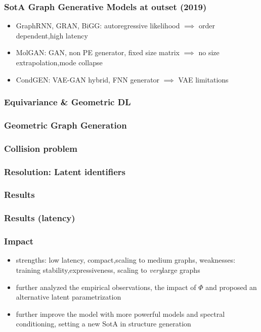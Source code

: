 \documentclass[./presentation.tex]{subfiles}
\begin{document}
\begin{frame}[label=working]
  \frametitle{SotA Graph Generative Models at outset (2019)}
  \begin{itemize}
    \item GraphRNN, GRAN, BiGG: autoregressive likelihood $\implies$ order dependent,high latency
    \item MolGAN: GAN, non PE generator, fixed size matrix  $\implies$ no size extrapolation,mode collapse
    \item CondGEN: VAE-GAN hybrid, FNN generator $\implies$ VAE limitations \citep{bousquetOptimalTransportGenerative2017a, genevayGANVAEOptimal2017e}
  \end{itemize}
\end{frame}

\begin{frame}[label=working]
  \frametitle{Equivariance \& Geometric DL}
\end{frame}
\begin{frame}[label=working,t]
  \frametitle{Geometric Graph Generation}
  
\end{frame}

\begin{frame}[label=working,t]
  \frametitle{Collision problem}
  
\end{frame}
\begin{frame}[label=working,t]
  \frametitle{Resolution: Latent identifiers}
  
\end{frame}
\begin{frame}[label=working,t]
  \frametitle{Results}
  
\end{frame}
\begin{frame}[label=working,t]
  \frametitle{Results (latency)}
  
\end{frame}


\begin{frame}[label=working,t]
  \frametitle{Impact}
  \begin{itemize}
    \item strengths: low latency\checkmark, compact\checkmark,scaling to medium graphs\checkmark, weaknesses: training stability,expressiveness, scaling to \emph{very}large graphs
    \item \citep{vignacTopNEquivariantSet2021d} further analyzed the empirical observations, the impact of $\Phi$ and proposed an alternative latent parametrization
    \item \citep{martinkusSPECTRESpectralConditioning2022b} further improve the model with more powerful models and spectral conditioning, setting a new SotA in structure generation
  \end{itemize}
\end{frame}
\end{document}
